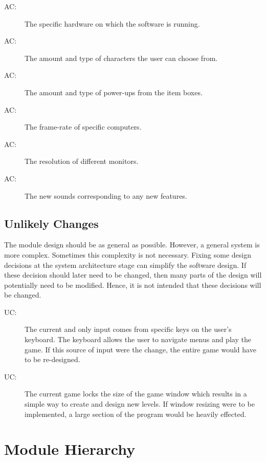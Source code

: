 \documentclass[12pt, titlepage]{article}
\newcounter{acnum}
\newcommand{\actheacnum}{AC\theacnum}
\newcounter{ucnum}
\newcommand{\uctheucnum}{UC\theucnum}
\begin{document}
\begin{description}
\item[ \actheacnum \label{acHardware}:] The specific hardware on which the software is running.
\item[ \actheacnum \label{acCharacters}:] The amount and type of characters the user can choose from.
\item[ \actheacnum \label{acPower}:] The amount and type of power-ups from the item boxes.
\item[ \actheacnum \label{acSpeed}:] The frame-rate of specific computers.
\item[ \actheacnum \label{acRes}:] The resolution of different monitors.
\item[ \actheacnum \label{acSound}:] The new sounds corresponding to any new features.
\end{description}

\subsection{Unlikely Changes} \label{SecUchange}

The module design should be as general as possible. However, a general system is
more complex. Sometimes this complexity is not necessary. Fixing some design
decisions at the system architecture stage can simplify the software design. If
these decision should later need to be changed, then many parts of the design
will potentially need to be modified. Hence, it is not intended that these
decisions will be changed.

\begin{description}
\item[ \uctheucnum \label{ucIO}:] The current and only input comes from specific keys on the user's keyboard. The keyboard allows the user to navigate menus and play the game. If this source of input were the change, the entire game would have to be re-designed.
\item[ \uctheucnum \label{ucWindow}:] The current game locks the size of the game window which results in a simple way to create and design new levels. If window resizing were to be implemented, a large section of the program would be heavily effected.
\end{description}

\section{Module Hierarchy} \label{SecMH}
\end{document}
